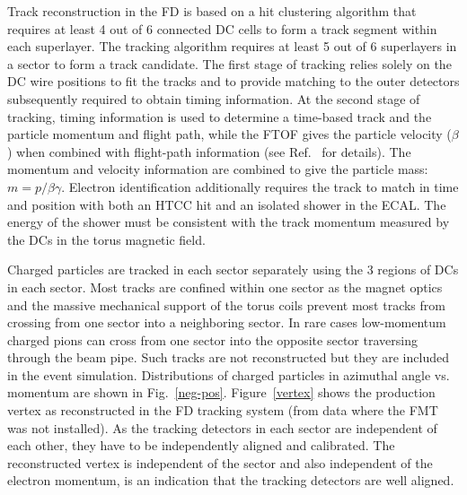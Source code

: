 \documentclass[final,3p,twocolumn]{elsarticle}
\begin{document}
Track reconstruction in the FD is based on a hit clustering algorithm that requires at least 4 out of 6 connected DC
cells to form a track segment within each superlayer.  The tracking algorithm requires at least 5 out of 6 superlayers
in a sector to form a track candidate. The first stage of tracking relies solely on the DC wire positions to fit the
tracks and to provide matching to the outer detectors subsequently required to obtain timing information. At the
second stage of tracking, timing information is used to determine a time-based track and the particle momentum
and flight path, while the FTOF gives the particle velocity ($\beta$) when combined with flight-path information
(see Ref.~\cite{Software} for details). The momentum and velocity information are combined to give the particle
mass: $m = p/\beta\gamma$. Electron identification additionally requires the track to match in time and position
with both an HTCC hit and an isolated shower in the ECAL. The energy of the shower must be consistent with the
track momentum measured by the DCs in the torus magnetic field. 

Charged particles are tracked in each sector separately using the 3 regions of DCs in each sector. Most tracks
are confined within one sector as the magnet optics and the massive mechanical support of the torus coils prevent
most tracks from crossing from one sector into a neighboring sector. In rare cases low-momentum charged pions
can cross from one sector into the opposite sector traversing through the beam pipe. Such tracks are not
reconstructed but they are included in the event simulation. Distributions of charged particles in azimuthal angle
vs. momentum are shown in Fig.~\ref{neg-pos}. Figure~\ref{vertex} shows the production vertex as
reconstructed in the FD tracking system (from data where the FMT was not installed). As the tracking detectors in each sector 
are independent of each other, they have to be independently aligned and calibrated. The reconstructed 
vertex is independent of the sector and also independent of the electron momentum, is an indication that the 
tracking detectors are well aligned.  
\end{document}
